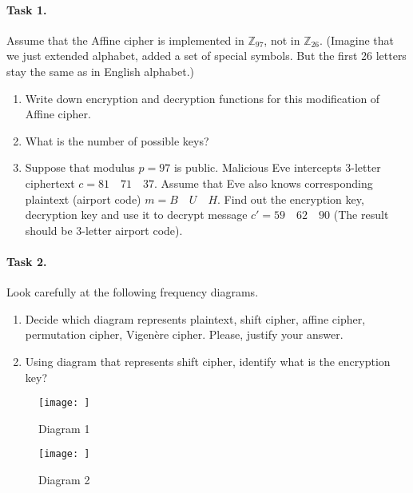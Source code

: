 \documentclass{article}
\begin{document}
\paragraph{Task 1.} Assume that the Affine cipher is implemented in $\mathbb{Z}_{97}$, not in $\mathbb{Z}_{26}$. (Imagine that we just extended alphabet, added a set of special symbols. But the first 26 letters stay the same as in English alphabet.) 
\begin{enumerate}
    \item Write down encryption and decryption functions for this modification of Affine cipher.
    \item What is the number of possible keys?
    \item Suppose that modulus $p=97$ is public. Malicious Eve intercepts 3-letter ciphertext $c = 81 \quad 71 \quad 37$. Assume that Eve also knows corresponding plaintext (airport code) $m = B \quad	U \quad H$. Find out the encryption key, decryption key and use it to decrypt message $c' = 59 \quad 62 \quad 90$ (The result should be 3-letter airport code).
\end{enumerate}

\paragraph{Task 2.} Look carefully at the following frequency diagrams.
\begin{enumerate}
    \item Decide which diagram represents plaintext, shift cipher, affine cipher, permutation cipher, Vigenère cipher. Please, justify your answer.
    \item Using diagram that represents shift cipher, identify what is the encryption key?
\end{enumerate}

\begin{figure}[H]
    \begin{center}
        \texttt{[image: ]}
        \caption{Diagram 1}

    \end{center}
\end{figure}

\begin{figure}[H]
    \begin{center}
       \texttt{[image: ]}
        \caption{Diagram 2}

    \end{center}
\end{figure}
\end{document}
